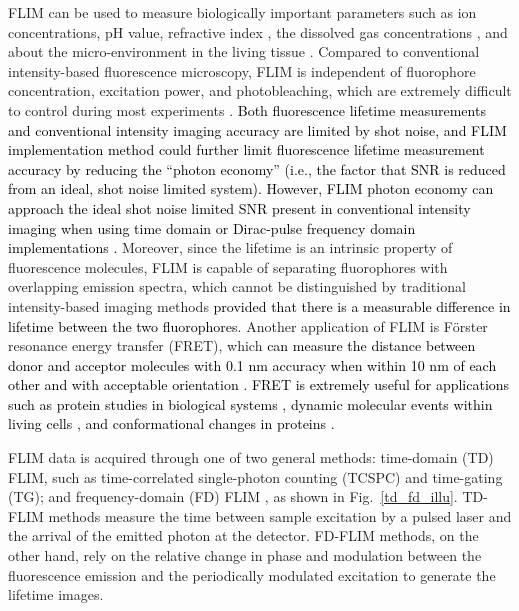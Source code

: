 \documentclass[12pt]{iopart}
\newcommand{\cc}[1]{\textcolor{black}{#1}}
\begin{document}
FLIM can be used to measure biologically important parameters such as ion concentrations, pH value, refractive index \cite{won2011precision}, the dissolved gas concentrations \cite{khan2014easily, khan2017silica, finikova2008oxygen}, and about the micro-environment in the living tissue \cite{sakadvzic2010two, ProteinInteractions, howard2013frequency}. Compared to conventional intensity-based fluorescence microscopy, FLIM is independent of fluorophore concentration, excitation power, and photobleaching, which are extremely difficult to control during most experiments \cite{FLIM_Optimization}.
\cc{Both fluorescence lifetime measurements and conventional intensity imaging accuracy are limited by shot noise, and FLIM implementation method could further limit fluorescence lifetime measurement accuracy by reducing the \enquote{photon economy} (i.e., the factor that SNR is reduced from an ideal, shot noise limited system). However, FLIM photon economy can approach the ideal shot noise limited SNR present in conventional intensity imaging when using time domain or Dirac-pulse frequency domain implementations \cite{josa, philip2003theoretical}.}
Moreover, since the lifetime is an intrinsic property of fluorescence molecules, FLIM is capable of separating fluorophores with overlapping emission spectra, which cannot be distinguished by traditional intensity-based imaging methods \cc{provided that there is a measurable difference in lifetime between the two fluorophores}. Another application of FLIM is F\"{o}rster resonance energy transfer (FRET), which \cc{can measure the distance between donor and acceptor molecules with 0.1 nm accuracy when within 10 nm of each other and with acceptable orientation \cite{FRET_ref, won2010referencing, hellenkamp2018precision_FRET}. FRET is extremely useful for applications such as protein studies in biological systems \cite{ma2014application_F1}, dynamic molecular events within living cells \cite{pollok1999using_F2}, and conformational changes in proteins \cite{rajoria2014flim_F3}.}


FLIM data is acquired through one of two general methods: time-domain (TD) FLIM, such as time-correlated single-photon counting (TCSPC) \cite{TCSPC} and time-gating (TG)\cite{TimeGatingFLIM}; and frequency-domain (FD) FLIM \cite{SuperSensitivity,ProteinInteractions}, as shown in Fig.~\ref{td_fd_illu}. TD-FLIM methods measure the time between sample excitation by a pulsed laser and the arrival of the emitted photon at the detector. FD-FLIM methods, on the other hand, rely on the relative change in phase and modulation between the fluorescence emission and the periodically modulated excitation to generate the lifetime images.
\end{document}
